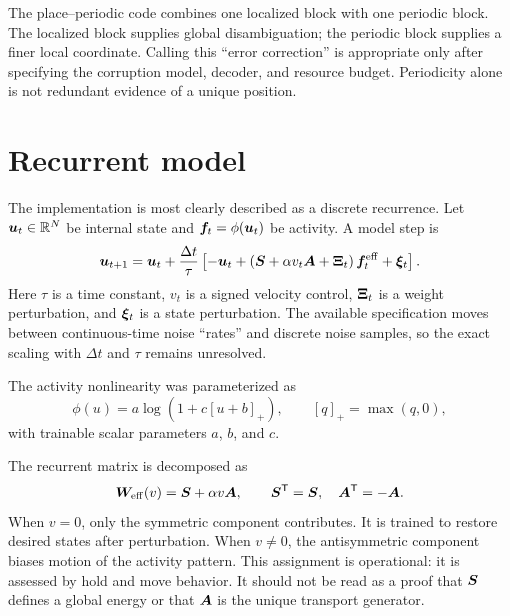 The place--periodic code combines one localized block with one periodic block. The localized block supplies global disambiguation; the periodic block supplies a finer local coordinate. Calling this ``error correction'' is appropriate only after specifying the corruption model, decoder, and resource budget. Periodicity alone is not redundant evidence of a unique position.

\section{Recurrent model}
\label{sec:attractor-model}

The implementation is most clearly described as a discrete recurrence. Let $\bm{u}_t\in\mathbb{R}^N$ be internal state and $\bm{f}_t=\phi(\bm{u}_t)$ be activity. A model step is
\begin{equation}
\label{eq:attractor-discrete}
\bm{u}_{t+1}
=\bm{u}_t+\frac{\Delta t}{\tau}
\left[
-\bm{u}_t
+\left(\bm{S}+\alpha v_t\bm{A}+\bm{\Xi}_t\right)
\bm{f}^{\mathrm{eff}}_t
+\bm{\xi}_t
\right].
\end{equation}
Here $\tau$ is a time constant, $v_t$ is a signed velocity control, $\bm{\Xi}_t$ is a weight perturbation, and $\bm{\xi}_t$ is a state perturbation. The available specification moves between continuous-time noise ``rates'' and discrete noise samples, so the exact scaling with $\Delta t$ and $\tau$ remains unresolved.

The activity nonlinearity was parameterized as
\begin{equation}
\label{eq:attractor-nonlinearity}
\phi(u)=a\log\left(1+c[u+b]_+\right),
\qquad [q]_+=\max(q,0),
\end{equation}
with trainable scalar parameters $a$, $b$, and $c$.

The recurrent matrix is decomposed as
\begin{equation}
\label{eq:attractor-effective-weight}
\bm{W}_{\mathrm{eff}}(v)
=\bm{S}+\alpha v\bm{A},
\qquad
\bm{S}^{\mathsf{T}}=\bm{S},
\quad
\bm{A}^{\mathsf{T}}=-\bm{A}.
\end{equation}
When $v=0$, only the symmetric component contributes. It is trained to restore desired states after perturbation. When $v\neq0$, the antisymmetric component biases motion of the activity pattern. This assignment is operational: it is assessed by hold and move behavior. It should not be read as a proof that $\bm{S}$ defines a global energy or that $\bm{A}$ is the unique transport generator.


